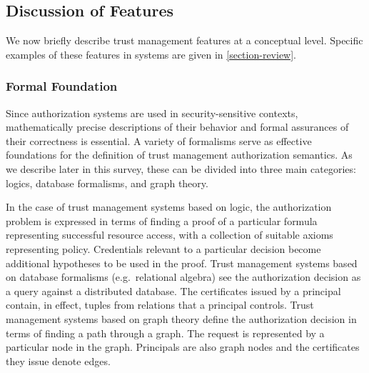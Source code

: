 %

%


\subsection{Discussion of Features}

We now briefly describe trust management features at a conceptual
level.  Specific examples of these features in systems are given in
\autoref{section-review}.

\subsubsection{Formal Foundation} 
Since authorization systems are used in security-sensitive contexts,
mathematically precise descriptions of their behavior and formal
assurances of their correctness is essential.  A variety of formalisms
serve as effective foundations for the definition of trust management
authorization semantics.  As we describe later in this survey, these
can be divided into three main categories: logics, database
formalisms, and graph theory.

In the case of trust management systems based on logic, the
authorization problem is expressed in terms of finding a proof of a
particular formula representing successful resource access, with a
collection of suitable axioms representing policy.  Credentials
relevant to a particular decision become additional hypotheses to be
used in the proof.  Trust management systems based on database
formalisms (e.g.~relational algebra) see the authorization decision as
a query against a distributed database. The certificates issued by a
principal contain, in effect, tuples from relations that a principal
controls.  Trust management systems based on graph theory define the
authorization decision in terms of finding a path through a graph. The
request is represented by a particular node in the graph. Principals
are also graph nodes and the certificates they issue denote edges.


